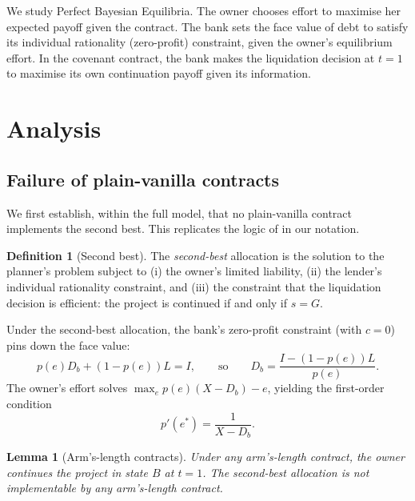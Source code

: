 \documentclass[12pt,a4paper]{article}
\theoremstyle{plain}
\newtheorem{lemma}[theorem]{Lemma}
\theoremstyle{definition}
\newtheorem{definition}[theorem]{Definition}
\theoremstyle{remark}
\begin{document}
We study Perfect Bayesian Equilibria. The owner chooses effort to maximise her
expected payoff given the contract. The bank sets the face value of debt to satisfy
its individual rationality (zero-profit) constraint, given the owner's equilibrium
effort. In the covenant contract, the bank makes the liquidation decision at $t=1$ to
maximise its own continuation payoff given its information.

\section{Analysis}
\label{sec:analysis}

\subsection{Failure of plain-vanilla contracts}
\label{subsec:plain_vanilla_failure}

We first establish, within the full model, that no plain-vanilla contract implements
the second best. This replicates the logic of \citet{Rajan1992} in our notation.

\begin{definition}[Second best]
\label{d:second_best}
The \emph{second-best} allocation is the solution to the planner's problem subject to
(i) the owner's limited liability, (ii) the lender's individual rationality constraint,
and (iii) the constraint that the liquidation decision is efficient: the project is
continued if and only if $s = G$.
\end{definition}

Under the second-best allocation, the bank's zero-profit constraint (with $c = 0$)
pins down the face value:
\begin{equation}
  p(e) D_b + (1-p(e)) L = I,
  \qquad \text{so} \qquad
  D_b = \frac{I - (1-p(e))L}{p(e)}.
  \label{eq:bank_zp}
\end{equation}
The owner's effort solves $\max_e p(e)(X - D_b) - e$, yielding the first-order
condition
\begin{equation}
  p'(e^*) = \frac{1}{X - D_b}.
  \label{eq:foc_sb}
\end{equation}

\begin{lemma}[Arm's-length contracts]
\label{l:al_fails}
Under any arm's-length contract, the owner continues the project in state $B$ at
$t=1$. The second-best allocation is not implementable by any arm's-length contract.
\end{lemma}
\end{document}
